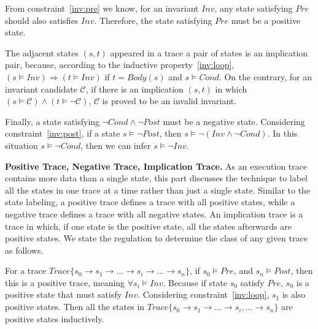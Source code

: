 
From constraint~\ref{inv:pre} we know, for an invariant $Inv$, 
any state satisfying $Pre$ should also satisfies $Inv$. 
Therefore, the state satisfying $Pre$ must be a positive state. 

The adjacent states $(s, t)$ appeared in a trace a pair of states is an implication pair,
because, according to the inductive property~\ref{inv:loop},
$(s \models Inv) \Rightarrow (t \models {Inv})$
if $t = Body(s)$ and $s \models Cond$.
On the contrary, for an invariant candidate $\mathcal{C}$, 
if there is an implication $(s, t)$ in which $(s \models \mathcal{C}) \wedge (t \models \neg \mathcal{C})$,
$\mathcal{C}$ is proved to be an invalid invariant.

Finally, a state satisfying $\neg{Cond} \wedge \neg{Post}$ must be a negative state.
Considering constraint~\ref{inv:post}, if a state $s \models \neg{Post}$,
then $s \models \neg(Inv \wedge \neg Cond)$.
In this situation $s \models \neg Cond$, then we can infer $s \models \neg Inv$. 

\medskip\noindent
\textbf{Positive Trace, Negative Trace, Implication Trace.}
As an execution trace contains more data than a single state,
this part discusses the technique to label all the states in one trace at a time rather than just a single state.
Similar to the state labeling, a positive trace defines a trace with all positive states,
while a negative trace defines a trace with all negative states.
An implication trace is a trace in which, if one state is the positive state, 
all the states afterwards are positive states.
We state the regulation to determine the class of any given trace as follows.

For a trace $Trace\{s_0 \to s_1 \to ... \to s_i \to ... \to s_n\}$, 
if $s_0 \models Pre$, and $s_n \models Post$,
then this is a positive trace, meaning $\forall s_i \models Inv$.
Because if state $s_0$ satisfy $Pre$,
$s_0$ is a positive state that must satisfy $Inv$. %
Considering constraint~\ref{inv:loop}, $s_1$ is also positive states.
Then all the states in $Trace\{s_0 \to s_1 \to ...\to s_i, ... \to s_n\}$ are positive states inductively. 

